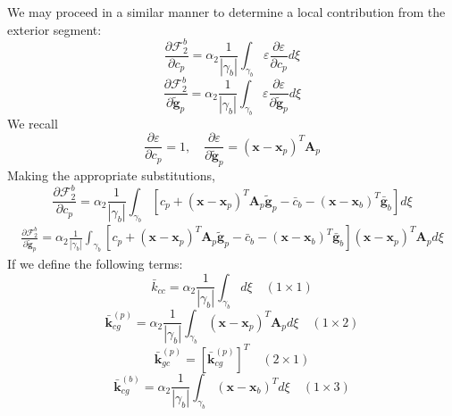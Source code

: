 \documentclass[11pt]{article} %
\begin{document}
We may proceed in a similar manner to determine a local contribution from the exterior segment:
\begin{equation}
	\frac{\partial \mathcal{F}^b_2}{\partial c_p} = \alpha_2 \frac{1}{| \gamma_b |} \int_{\gamma_b} \varepsilon \frac{\partial \varepsilon}{\partial c_p} d \xi
\end{equation}
\begin{equation}
	\frac{\partial \mathcal{F}^b_2}{\partial \tilde{\mathbf{g}}_p} = \alpha_2 \frac{1}{| \gamma_b |} \int_{\gamma_b} \varepsilon \frac{\partial \varepsilon}{\partial \tilde{\mathbf{g}}_p} d \xi
\end{equation}
We recall
\begin{equation}
	\frac{\partial \varepsilon}{\partial c_p} = 1, \quad \frac{\partial \varepsilon}{\partial \tilde{\mathbf{g}}_p} = (\mathbf{x} - \mathbf{x}_p)^T \mathbf{A}_p
\end{equation}
Making the appropriate substitutions,
\begin{equation}
	\frac{\partial \mathcal{F}^b_2}{\partial c_p} = \alpha_2 \frac{1}{| \gamma_b |} \int_{\gamma_b} \left[ c_p + (\mathbf{x} - \mathbf{x}_p)^T \mathbf{A}_p \tilde{\mathbf{g}}_p - \bar{c}_b - (\mathbf{x} - \mathbf{x}_b)^T \bar{\mathbf{g}}_b \right] d \xi
\end{equation}
\begin{eqnarray}
	\frac{\partial \mathcal{F}^b_2}{\partial \tilde{\mathbf{g}}_p} = \alpha_2 \frac{1}{| \gamma_b |} \int_{\gamma_b} \left[ c_p + (\mathbf{x} - \mathbf{x}_p)^T \mathbf{A}_p \tilde{\mathbf{g}}_p - \bar{c}_b - (\mathbf{x} - \mathbf{x}_b)^T \bar{\mathbf{g}}_b \right] (\mathbf{x} - \mathbf{x}_p)^T \mathbf{A}_p d \xi
\end{eqnarray}
If we define the following terms:
\begin{equation}
	\bar{k}_{cc} = \alpha_2 \frac{1}{| \gamma_b |} \int_{\gamma_b} d \xi \quad (1 \times 1)
\end{equation}
\begin{equation}
	\bar{\mathbf{k}}_{cg}^{(p)} = \alpha_2 \frac{1}{| \gamma_b |} \int_{\gamma_b} (\mathbf{x} - \mathbf{x}_p)^T \mathbf{A}_p d \xi \quad (1 \times 2)
\end{equation}
\begin{equation}
	\bar{\mathbf{k}}_{gc}^{(p)} = \left[ \bar{\mathbf{k}}_{cg}^{(p)} \right]^T \quad (2 \times 1)
\end{equation}
\begin{equation}
	\bar{\mathbf{k}}_{cg}^{(b)} = \alpha_2 \frac{1}{| \gamma_b |} \int_{\gamma_b} (\mathbf{x} - \mathbf{x}_b)^T d \xi \quad (1 \times 3)
\end{equation}
\end{document}
